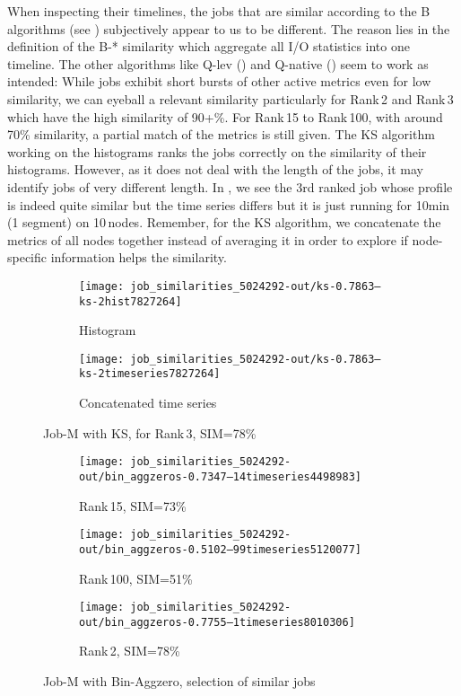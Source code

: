 \documentclass{jhps}
\begin{document}
When inspecting their timelines, the jobs that are similar according to the B algorithms (see ) subjectively appear to us to be different. 
The reason lies in the definition of the B-* similarity which aggregate all I/O statistics into one timeline.
The other algorithms like Q-lev () and Q-native () seem to work as intended:
While jobs exhibit short bursts of other active metrics even for low similarity, we can eyeball a relevant similarity particularly for Rank\,2 and Rank\,3 which have the high similarity of 90+\%. For Rank\,15 to Rank\,100, with around 70\% similarity, a partial match of the metrics is still given.
The KS algorithm working on the histograms ranks the jobs correctly on the similarity of their histograms.
However, as it does not deal with the length of the jobs, it may identify jobs of very different length.
In , we see the 3rd ranked job whose profile is indeed quite similar but the time series differs but it is just running for 10min (1 segment) on 10\,nodes.
Remember, for the KS algorithm, we concatenate the metrics of all nodes together instead of averaging it in order to explore if node-specific information helps the similarity.

\begin{figure}[bt]
\begin{subfigure}{0.5\textwidth}
\centering
\texttt{[image: job\_similarities\_5024292-out/ks-0.7863--ks-2hist7827264]}
\caption{Histogram}
\end{subfigure}
\qquad
\begin{subfigure}{0.36\textwidth}
\centering
\texttt{[image: job\_similarities\_5024292-out/ks-0.7863--ks-2timeseries7827264]}
\caption{Concatenated time series}
\end{subfigure}

\caption{Job-M with KS, for Rank\,3, SIM=78\%}%
\label{fig:job-M-ks}
\end{figure}




\begin{figure}[bt]
\begin{subfigure}{0.47\textwidth}
\centering
\texttt{[image: job\_similarities\_5024292-out/bin\_aggzeros-0.7347--14timeseries4498983]}
\caption{Rank\,15, SIM=73\%}
\end{subfigure}
\begin{subfigure}{0.47\textwidth}
\centering
\texttt{[image: job\_similarities\_5024292-out/bin\_aggzeros-0.5102--99timeseries5120077]}
\caption{Rank\,100, SIM=51\% }
\end{subfigure}

\begin{subfigure}{0.47\textwidth}
\centering
\texttt{[image: job\_similarities\_5024292-out/bin\_aggzeros-0.7755--1timeseries8010306]}
\caption{Rank\,2, SIM=78\%}
\end{subfigure}
\caption{Job-M with Bin-Aggzero, selection of similar jobs}%
\label{fig:job-M-bin-aggzero}
\end{figure}
\end{document}
